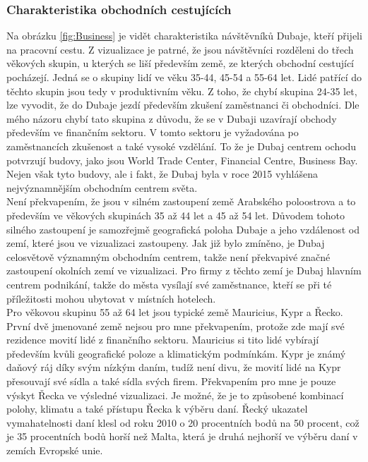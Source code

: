 \documentclass[czech,BP]{thesiskiv}
\begin{document}
\subsubsection{Charakteristika obchodních cestujících}
Na obrázku \ref{fig:Business} je vidět charakteristika návštěvníků Dubaje, kteří přijeli na pracovní cestu. Z vizualizace je patrné, že jsou návštěvníci rozděleni do třech věkových skupin, u kterých se liší především země, ze kterých obchodní cestující pocházejí. Jedná se o skupiny lidí ve věku 35-44, 45-54 a 55-64 let. Lidé patřící do těchto skupin jsou tedy v produktivním věku. Z toho, že chybí skupina 24-35 let, lze vyvodit, že do Dubaje jezdí především zkušení zaměstnanci či obchodníci. Dle mého názoru chybí tato skupina z důvodu, že se v Dubaji uzavírají obchody především ve finančním sektoru. V tomto sektoru je vyžadována po zaměstnancích zkušenost a také vysoké vzdělání. To že je Dubaj centrem ochodu potvrzují budovy, jako jsou World Trade Center, Financial Centre, Business Bay. Nejen však tyto budovy, ale i fakt, že Dubaj byla v roce 2015 vyhlášena nejvýznamnějším obchodním centrem světa.\cite{BusinessDubai} 
\\
Není překvapením, že jsou v silném zastoupení země Arabského poloostrova a to především ve věkových skupinách 35 až 44 let a 45 až 54 let. Důvodem tohoto silného zastoupení je samozřejmě geografická poloha Dubaje a jeho vzdálenost od zemí, které jsou ve vizualizaci zastoupeny. Jak již bylo zmíněno, je Dubaj celosvětově významným obchodním centrem, takže není překvapivé značné zastoupení okolních zemí ve vizualizaci. Pro firmy z těchto zemí je Dubaj hlavním centrem podnikání, takže do města vysílají své zaměstnance, kteří se při té příležitosti mohou ubytovat v místních hotelech.
\\
Pro věkovou skupinu 55 až 64 let jsou typické země Mauricius, Kypr a Řecko. První dvě jmenované země nejsou pro mne překvapením, protože zde mají své rezidence movití lidé z finančního sektoru. Mauricius si tito lidé vybírají především kvůli geografické poloze a klimatickým podmínkám. Kypr je známý daňový ráj díky svým nízkým daním, tudíž není divu, že movití lidé na Kypr přesouvají své sídla a také sídla svých firem. Překvapením pro mne je pouze výskyt Řecka ve výsledné vizualizaci. Je možné, že je to způsobené kombinací polohy, klimatu a také přístupu Řecka k výběru daní. Řecký ukazatel vymahatelnosti daní klesl od roku 2010 o 20 procentních bodů na 50 procent, což je 35 procentních bodů horší než Malta, která je druhá nejhorší ve výběru daní v zemích Evropské unie.\cite{GreeceTaxes} 
\end{document}
